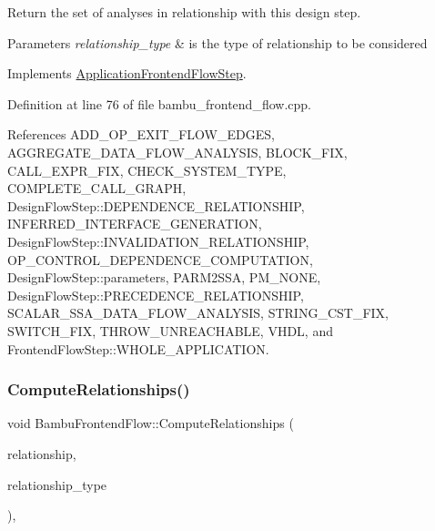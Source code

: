 Return the set of analyses in relationship with this design step. 


\begin{DoxyParams}{Parameters}
{\em relationship\+\_\+type} & is the type of relationship to be considered \\
\hline
\end{DoxyParams}


Implements \hyperlink{classApplicationFrontendFlowStep_ab308200c0096ccff3a1ff50e864ed61f}{Application\+Frontend\+Flow\+Step}.



Definition at line 76 of file bambu\+\_\+frontend\+\_\+flow.\+cpp.



References A\+D\+D\+\_\+\+O\+P\+\_\+\+E\+X\+I\+T\+\_\+\+F\+L\+O\+W\+\_\+\+E\+D\+G\+ES, A\+G\+G\+R\+E\+G\+A\+T\+E\+\_\+\+D\+A\+T\+A\+\_\+\+F\+L\+O\+W\+\_\+\+A\+N\+A\+L\+Y\+S\+IS, B\+L\+O\+C\+K\+\_\+\+F\+IX, C\+A\+L\+L\+\_\+\+E\+X\+P\+R\+\_\+\+F\+IX, C\+H\+E\+C\+K\+\_\+\+S\+Y\+S\+T\+E\+M\+\_\+\+T\+Y\+PE, C\+O\+M\+P\+L\+E\+T\+E\+\_\+\+C\+A\+L\+L\+\_\+\+G\+R\+A\+PH, Design\+Flow\+Step\+::\+D\+E\+P\+E\+N\+D\+E\+N\+C\+E\+\_\+\+R\+E\+L\+A\+T\+I\+O\+N\+S\+H\+IP, I\+N\+F\+E\+R\+R\+E\+D\+\_\+\+I\+N\+T\+E\+R\+F\+A\+C\+E\+\_\+\+G\+E\+N\+E\+R\+A\+T\+I\+ON, Design\+Flow\+Step\+::\+I\+N\+V\+A\+L\+I\+D\+A\+T\+I\+O\+N\+\_\+\+R\+E\+L\+A\+T\+I\+O\+N\+S\+H\+IP, O\+P\+\_\+\+C\+O\+N\+T\+R\+O\+L\+\_\+\+D\+E\+P\+E\+N\+D\+E\+N\+C\+E\+\_\+\+C\+O\+M\+P\+U\+T\+A\+T\+I\+ON, Design\+Flow\+Step\+::parameters, P\+A\+R\+M2\+S\+SA, P\+M\+\_\+\+N\+O\+NE, Design\+Flow\+Step\+::\+P\+R\+E\+C\+E\+D\+E\+N\+C\+E\+\_\+\+R\+E\+L\+A\+T\+I\+O\+N\+S\+H\+IP, S\+C\+A\+L\+A\+R\+\_\+\+S\+S\+A\+\_\+\+D\+A\+T\+A\+\_\+\+F\+L\+O\+W\+\_\+\+A\+N\+A\+L\+Y\+S\+IS, S\+T\+R\+I\+N\+G\+\_\+\+C\+S\+T\+\_\+\+F\+IX, S\+W\+I\+T\+C\+H\+\_\+\+F\+IX, T\+H\+R\+O\+W\+\_\+\+U\+N\+R\+E\+A\+C\+H\+A\+B\+LE, V\+H\+DL, and Frontend\+Flow\+Step\+::\+W\+H\+O\+L\+E\+\_\+\+A\+P\+P\+L\+I\+C\+A\+T\+I\+ON.

\mbox{\label{classBambuFrontendFlow_a17a62b2f18ad3df23ec7a5418059c465}} 
\subsubsection{\texorpdfstring{Compute\+Relationships()}{ComputeRelationships()}}
{\footnotesize\ttfamily void Bambu\+Frontend\+Flow\+::\+Compute\+Relationships (\begin{DoxyParamCaption}\item[{\hyperlink{classDesignFlowStepSet}{Design\+Flow\+Step\+Set} \&}]{relationship,  }\item[{const \hyperlink{classDesignFlowStep_a723a3baf19ff2ceb77bc13e099d0b1b7}{Design\+Flow\+Step\+::\+Relationship\+Type}}]{relationship\+\_\+type }\end{DoxyParamCaption})\hspace{0.3cm}{\ttfamily [override]}, {\ttfamily [virtual]}}



